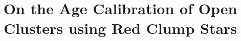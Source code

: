 \documentclass[twocolumn,times]{aastex631}
\begin{document}
\title{On the Age Calibration of Open Clusters using Red Clump Stars}


\end{document}
